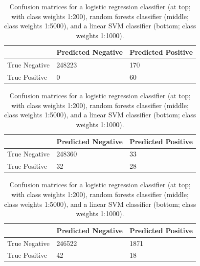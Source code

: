 \begin{table}[t]
\centering
\begin{tabular}{@{}lll@{}}
\toprule
              & Predicted Negative & Predicted Positive \\ \midrule
True Negative & 248223             & 170                \\
True Positive & 0                  & 60                 \\ \bottomrule
\end{tabular}

\begin{tabular}{@{}lll@{}}
\toprule
              & Predicted Negative & Predicted Positive \\ \midrule
True Negative & 248360             & 33                 \\
True Positive & 32                 & 28                 \\ \bottomrule
\end{tabular}

\begin{tabular}{@{}lll@{}}
\toprule
              & Predicted Negative & Predicted Positive \\ \midrule
True Negative & 246522             & 1871               \\
True Positive & 42                 & 18                 \\ \bottomrule
\end{tabular}
\caption{Confusion matrices for a logistic regression classifier (at top; with class weights 1:200), random forests classifier (middle; class weights 1:5000), and a linear SVM classifier (bottom; class weights 1:1000).}
\label{fig:cmat}
\end{table}



